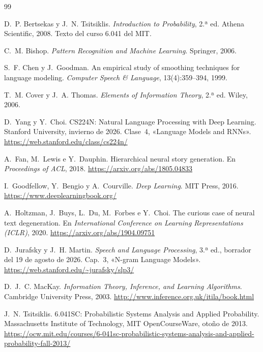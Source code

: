 \begin{thebibliography}{99}
\small

D.~P. Bertsekas y J.~N. Tsitsiklis.
\newblock \emph{Introduction to Probability}, 2.ª ed.
\newblock Athena Scientific, 2008.
\newblock Texto del curso 6.041 del MIT.

C.~M. Bishop.
\newblock \emph{Pattern Recognition and Machine Learning}.
\newblock Springer, 2006.

S.~F. Chen y J.~Goodman.
\newblock An empirical study of smoothing techniques for language modeling.
\newblock \emph{Computer Speech \& Language}, 13(4):359--394, 1999.

T.~M. Cover y J.~A. Thomas.
\newblock \emph{Elements of Information Theory}, 2.ª ed.
\newblock Wiley, 2006.

D.~Yang y Y.~Choi.
\newblock CS224N: Natural Language Processing with Deep Learning.
\newblock Stanford University, invierno de 2026. Clase~4, «Language Models and RNNs».
\newblock \url{https://web.stanford.edu/class/cs224n/}

A.~Fan, M.~Lewis e Y.~Dauphin.
\newblock Hierarchical neural story generation.
\newblock En \emph{Proceedings of ACL}, 2018.
\newblock \url{https://arxiv.org/abs/1805.04833}

I.~Goodfellow, Y.~Bengio y A.~Courville.
\newblock \emph{Deep Learning}.
\newblock MIT Press, 2016.
\newblock \url{https://www.deeplearningbook.org/}

A.~Holtzman, J.~Buys, L.~Du, M.~Forbes e Y.~Choi.
\newblock The curious case of neural text degeneration.
\newblock En \emph{International Conference on Learning Representations (ICLR)}, 2020.
\newblock \url{https://arxiv.org/abs/1904.09751}

D.~Jurafsky y J.~H. Martin.
\newblock \emph{Speech and Language Processing}, 3.ª ed., borrador del 19 de agosto de 2026.
\newblock Cap.~3, «N-gram Language Models».
\newblock \url{https://web.stanford.edu/~jurafsky/slp3/}

D.~J.~C. MacKay.
\newblock \emph{Information Theory, Inference, and Learning Algorithms}.
\newblock Cambridge University Press, 2003.
\newblock \url{http://www.inference.org.uk/itila/book.html}

J.~N. Tsitsiklis.
\newblock 6.041SC: Probabilistic Systems Analysis and Applied Probability.
\newblock Massachusetts Institute of Technology, MIT OpenCourseWare, otoño de 2013.
\newblock \url{https://ocw.mit.edu/courses/6-041sc-probabilistic-systems-analysis-and-applied-probability-fall-2013/}


\end{thebibliography}

